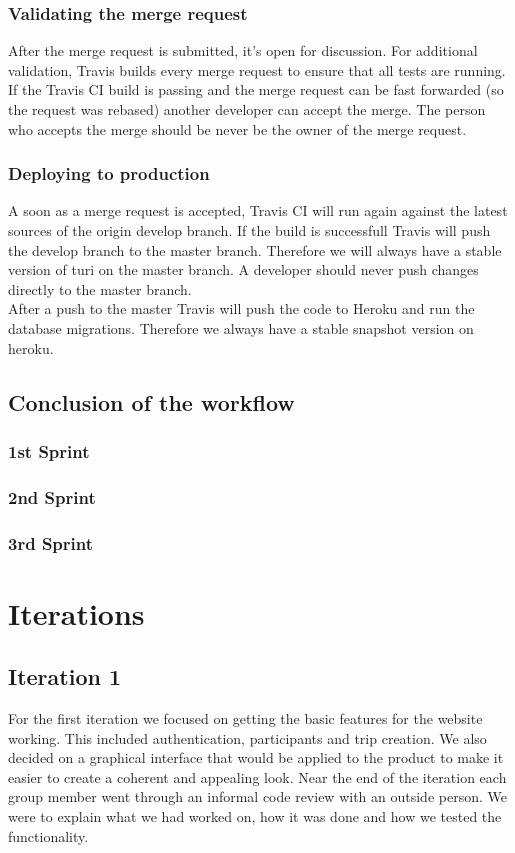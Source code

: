 \documentclass[a4paper]{article}
\begin{document}
\subsubsection{Validating the merge request}
After the merge request is submitted, it's open for discussion. For additional validation, Travis builds every merge request to ensure that all tests are running. If the Travis CI build is passing and the merge request can be fast forwarded (so the request was rebased) another developer can accept the merge. The person who accepts the merge should be never be the owner of the merge request.

\subsubsection{Deploying to production}
A soon as a merge request is accepted, Travis CI will run again against the latest sources of the origin develop branch. If the build is successfull Travis will push the develop branch to the master branch. Therefore we will always have a stable version of turi on the master branch. A developer should never push changes directly to the master branch.\\

\noindent
After a push to the master Travis will push the code to Heroku and run the database migrations. Therefore we always have a stable snapshot version on heroku.

\subsection{Conclusion of the workflow}
\subsubsection{1st Sprint}


\subsubsection{2nd Sprint}
\subsubsection{3rd Sprint}

\section{Iterations}
\subsection{Iteration 1}
For the first iteration we focused on getting the basic features for the website working. This included authentication, participants and trip creation. We also decided on a graphical interface that would be applied to the product to make it easier to create a coherent and appealing look. Near the end of the iteration each group member went through an informal code review with an outside person. We were to explain what we had worked on, how it was done and how we tested the functionality.\\
\end{document}
